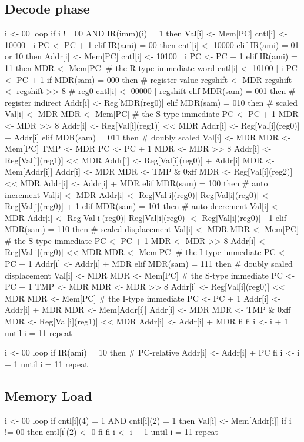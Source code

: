 \documentclass[12pt]{article}
\begin{document}
\subsection{Decode phase}
\begin{verbatimtab}
i <- 00
loop
	if i != 00 AND IR(imm)(i) = 1 then
		Val[i] <- Mem[PC]
		cntl[i] <- 10000 | i
		PC <- PC + 1
	elif IR(ami) = 00 then
		cntl[i] <- 10000
	elif IR(ami) = 01 or 10 then
		Addr[i] <- Mem[PC]
		cntl[i] <- 10100 | i
		PC <- PC + 1
	elif IR(ami) = 11 then
		MDR <- Mem[PC] # the R-type immediate word
		cntl[i] <- 10100 | i
		PC <- PC + 1
		if MDR(sam) = 000 then # register value
			regshift <- MDR
			regshift <- regshift >> 8 # reg0
			cntl[i] <- 00000 | regshift
		elif MDR(sam) = 001 then # register indirect
			Addr[i] <- Reg[MDR(reg0)]
		elif MDR(sam) = 010 then # scaled
			Val[i] <- MDR
			MDR <- Mem[PC] # the S-type immediate
			PC <- PC + 1
			MDR <- MDR >> 8
			Addr[i] <- Reg[Val[i](reg1)] << MDR
			Addr[i] <- Reg[Val[i](reg0)] + Addr[i]
		elif MDR(sam) = 011 then # doubly scaled
			Val[i] <- MDR
			MDR <- Mem[PC]
			TMP <- MDR
			PC <- PC + 1
			MDR <- MDR >> 8
			Addr[i] <- Reg[Val[i](reg1)] << MDR
			Addr[i] <- Reg[Val[i](reg0)] + Addr[i]
			MDR <- Mem[Addr[i]]
			Addr[i] <- MDR
			MDR <- TMP & 0xff
			MDR <- Reg[Val[i](reg2)] << MDR
			Addr[i] <- Addr[i] + MDR
		elif MDR(sam) = 100 then # auto increment
			Val[i] <- MDR
			Addr[i] <- Reg[Val[i](reg0)]
			Reg[Val[i](reg0)] <- Reg[Val[i](reg0)] + 1
		elif MDR(sam) = 101 then # auto decrement
			Val[i] <- MDR
			Addr[i] <- Reg[Val[i](reg0)]
			Reg[Val[i](reg0)] <- Reg[Val[i](reg0)] - 1
		elif MDR(sam) = 110 then # scaled displacement
			Val[i] <- MDR
			MDR <- Mem[PC] # the S-type immediate
			PC <- PC + 1
			MDR <- MDR >> 8
			Addr[i] <- Reg[Val[i](reg0)] << MDR
			MDR <- Mem[PC] # the I-type immediate
			PC <- PC + 1
			Addr[i] <- Addr[i] + MDR
		elif MDR(sam) = 111 then # doubly scaled displacement
			Val[i] <- MDR
			MDR <- Mem[PC] # the S-type immediate
			PC <- PC + 1
			TMP <- MDR
			MDR <- MDR >> 8
			Addr[i] <- Reg[Val[i](reg0)] << MDR
			MDR <- Mem[PC] # the I-type immediate
			PC <- PC + 1
			Addr[i] <- Addr[i] + MDR
			MDR <- Mem[Addr[i]]
			Addr[i] <- MDR
			MDR <- TMP & 0xff
			MDR <- Reg[Val[i](reg1)] << MDR
			Addr[i] <- Addr[i] + MDR
		fi
	fi
	i <- i + 1
until i = 11 repeat

i <- 00
loop
	if IR(ami) = 10 then # PC-relative
		Addr[i] <- Addr[i] + PC
	fi
	i <- i + 1
until i = 11 repeat
\end{verbatimtab}

\subsection{Memory Load}
\begin{verbatimtab}
i <- 00
loop
	if cntl[i](4) = 1 AND cntl[i](2) = 1 then
		Val[i] <- Mem[Addr[i]]
		if i != 00 then
			cntl[i](2) <- 0
		fi
	fi
	i <- i + 1
until i = 11 repeat
\end{verbatimtab}
\end{document}

